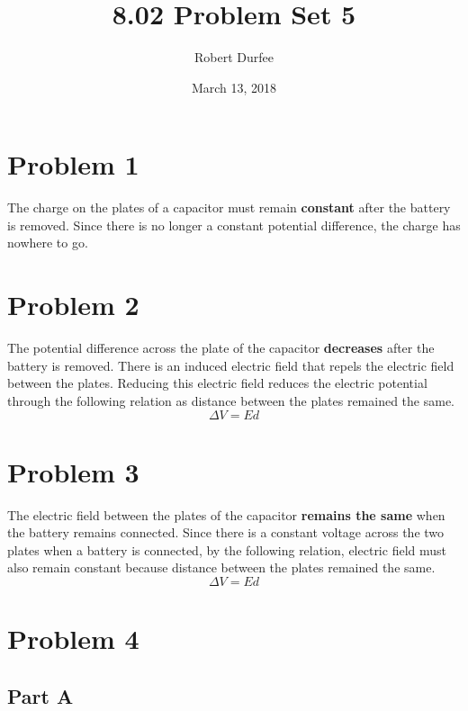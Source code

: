\documentclass{article}
\title{ 8.02 Problem Set 5 }
\author{ Robert Durfee }
\date{ March 13, 2018 }
\begin{document}
\maketitle

\section*{Problem 1 }

The charge on the plates of a capacitor must remain \textbf{constant} after the
battery is removed. Since there is no longer a constant potential difference,
the charge has nowhere to go.

\section*{Problem 2}

The potential difference across the plate of the capacitor \textbf{decreases}
after the battery is removed.  There is an induced electric field that repels
the electric field between the plates. Reducing this electric field reduces the
electric potential through the following relation as distance between the plates
remained the same.
$$ \Delta V = Ed $$

\section*{Problem 3}

The electric field between the plates of the capacitor \textbf{remains the same}
when the battery remains connected. Since there is a constant voltage across the
two plates when a battery is connected, by the following relation, electric
field must also remain constant because distance between the plates remained
the same.
$$ \Delta V = E d $$

\section*{Problem 4}

\subsection*{Part A}
\end{document}
